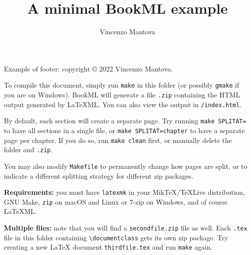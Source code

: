 \documentclass{book}
\title{A minimal BookML example}
\author{Vincenzo Mantova}
\begin{document}
\begin{lxFooter}
  Example of footer: copyright \copyright{} 2022 Vincenzo Mantova.
\end{lxFooter}

To compile this document, simply run \texttt{make} in this folder (or possibly \texttt{gmake} if you are on Windows). BookML will generate a file \texttt{\jobname.zip} containing the HTML output generated by LaTeXML. You can also view the output in \texttt{\jobname/index.html}.

By default, each section will create a separate page. Try running \texttt{make SPLITAT=} to have all sections in a single file, or \texttt{make SPLITAT=chapter} to have a separate page per chapter. If you do so, run \texttt{make clean} first, or manually delete the folder \texttt{\jobname} and \texttt{\jobname.zip}.

You may also modify \texttt{Makefile} to permanently change how pages are split, or to indicate a different splitting strategy for different zip packages.

\textbf{Requirements:} you must have \texttt{latexmk} in your MikTeX/TeXLive distribution, GNU Make, \texttt{zip} on macOS and Linux or 7-zip on Windows, and of course LaTeXML.

\textbf{Multiple files:} note that you will find a \texttt{secondfile.zip} file as well. Each \texttt{.tex} file in this folder containing \texttt{\textbackslash{}documentclass} gets its own zip package. Try creating a new \LaTeX{} document \texttt{thirdfile.tex} and run \texttt{make} again.


\end{document}
